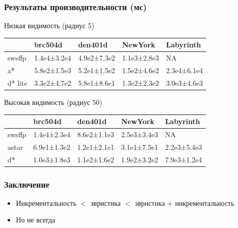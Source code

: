 \documentclass{beamer}
\begin{document}
    \begin{frame}
        \frametitle{Результаты производительности (мс)}
        Низкая видимость (радиус 5)

        \begin{tabular}{lllll}
            \hline
            & brc504d     & den401d     & NewYork     & Labyrinth   \\
            \hline
            swsffp  & 1.4e4±3.2e4 & 4.9e2±7.3e2 & 1.1e3±2.8e3 & NA          \\
            a*      & 5.8e2±1.5e3 & 5.2e1±1.5e2 & 1.5e2±4.6e2 & 2.3e4±6.1e4 \\
            d* lite & 3.3e2±4.7e2 & 5.8e1±8.6e1 & 1.3e2±2.3e2 & 3.0e3±4.6e3 \\
            \hline
        \end{tabular}

        \bigskip
        Высокая видимость (радиус 50)

        \begin{tabular}{lllll}
            \hline
            & brc504d     & den401d     & NewYork     & Labyrinth   \\
            \hline
            swsffp & 1.4e4±2.3e4 & 8.6e2±1.1e3 & 2.5e3±3.4e3 & NA          \\
            astar  & 6.9e1±1.3e2 & 1.2e1±2.1e1 & 3.1e1±7.5e1 & 2.2e3±5.4e3 \\
            d*     & 1.0e3±1.8e3 & 1.1e2±1.6e2 & 1.9e2±3.2e2 & 7.9e3±1.2e4 \\
            \hline
        \end{tabular}

    \end{frame}

    \newcommand{\dstarlite}{\(D^*\ lite\)\,}
    \begin{frame}
        \frametitle{Заключение}
        \begin{itemize}
            \item Инкрементальность $<$ эвристика $<$ эвристика $+$ инкрементальность
            \item Но не всегда
        \end{itemize}
    \end{frame}
\end{document}
